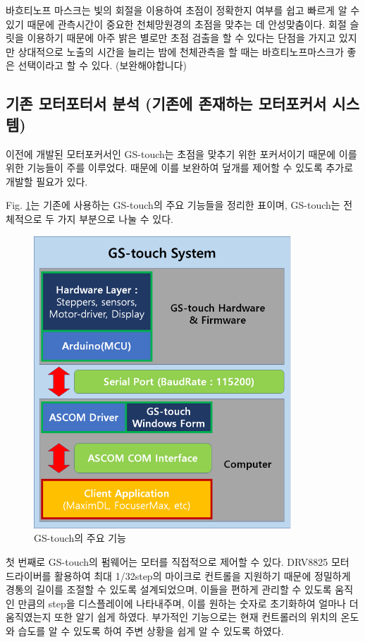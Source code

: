 \documentclass[twoside,11pt]{gshs_thesis}
\begin{document}
 바흐티노프 마스크는 빛의 회절을 이용하여 초점이 정확한지 여부를  쉽고 빠르게 알 수 있기 때문에 관측시간이 중요한 천체망원경의 초점을 맞추는 데 안성맞춤이다. 회절 슬릿을 이용하기 때문에 아주 밝은 별로만 초점 검출을 할 수 있다는 단점을 가지고 있지만 상대적으로 노출의 시간을 늘리는 밤에 천체관측을 할 때는 바흐티노프마스크가 좋은 선택이라고 할 수 있다.
(보완해야합니다)


\subsection{기존 모터포터서 분석 (기존에 존재하는 모터포커서 시스템)}


 이전에 개발된 모터포커서인 GS-touch는 초점을 맞추기 위한 포커서이기 때문에 이를 위한 기능들이 주를 이루었다. 때문에 이를 보완하여 덮개를 제어할 수 있도록 추가로 개발할 필요가 있다.
 
 
 Fig. \ref{GStocuh}는 기존에 사용하는 GS-touch의 주요 기능들을 정리한 표이며, GS-touch는 전체적으로 두 가지 부분으로 나눌 수 있다.
 \bigskip
 \begin{figure}[h]
 	\begin{center}
 		\includegraphics[width = 9.7cm]{GStouch}
 	\end{center}
 	\caption{GS-touch의 주요 기능}
 	\label{GStocuh}
 \end{figure}
  
첫 번째로 GS-touch의 펌웨어는 모터를 직접적으로 제어할 수 있다. DRV8825 모터 드라이버를 활용하여 최대 1/32step의 마이크로 컨트롤을 지원하기 때문에 정밀하게 경통의 길이를 조절할 수 있도록 설계되었으며, 이들을 편하게 관리할 수 있도록 움직인 만큼의 step을 디스플레이에 나타내주며, 이를 원하는 숫자로 초기화하여 얼마나 더 움직였는지 또한 알기 쉽게 하였다. 부가적인 기능으로는 현재 컨트롤러의 위치의 온도와 습도를 알 수 있도록 하여 주변 상황을 쉽게 알 수 있도록 하였다.
\end{document}
